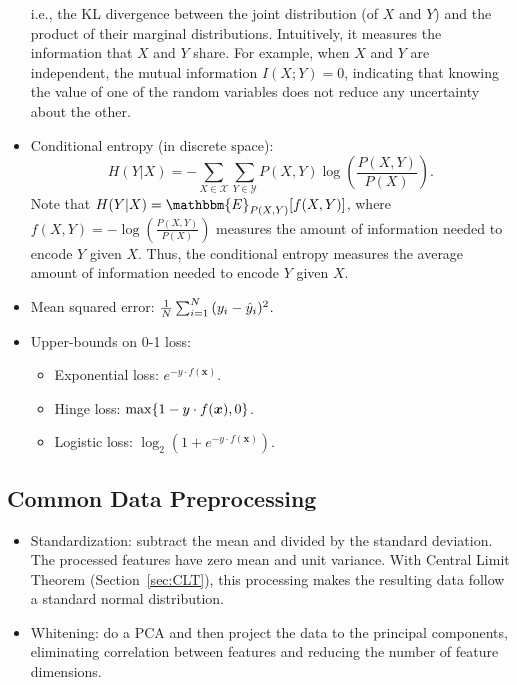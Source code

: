 \begin{itemize}
\begin{equation*}
            \end{equation*}
        i.e., the KL divergence between the joint distribution (of $X$ and $Y$) and the product of their marginal distributions.
        Intuitively, it measures the information that $X$ and $Y$ share. 
        For example, when $X$ and $Y$ are independent, the mutual information $I(X; Y)=0$, indicating that knowing the value of one of the random variables does not reduce any uncertainty about the other.
        \item Conditional entropy (in discrete space):
            \begin{equation*}
                H(Y|X) = - \sum_{X \in \mathcal{X}}^{}{
                    \sum_{Y \in \mathcal{Y}}^{}{
                        P(X, Y) \log\left(\frac{P(X, Y)}{P(X)}\right)
                    }
                }.
            \end{equation*}
        Note that $H(Y|X) = \mathbbm{E}_{P(X, Y)}[f(X, Y)]$, where $f(X, Y)=-\log\left(\frac{P(X, Y)}{P(X)}\right)$ measures the amount of information needed to encode $Y$ given $X$.
        Thus, the conditional entropy measures the average amount of information needed to encode $Y$ given $X$.
        \item Mean squared error: $\frac{1}{N}\sum_{i=1}^{N}{(y_i - \hat{y}_i)^2}$.
        \item Upper-bounds on 0-1 loss:
            \begin{itemize}
                \item Exponential loss: $e^{-y \cdot f(\bm{x})}$.
                \item Hinge loss: $\max\{ 1 - y \cdot f(\bm{x}), 0 \}$.
                \item Logistic loss: $\log_2\left( 1 + e^{-y \cdot f(\bm{x})}\right)$. 
            \end{itemize}
    \end{itemize}
    

\subsection{Common Data Preprocessing}
    \begin{itemize}
        \item Standardization: subtract the mean and divided by the standard deviation. The processed features have zero mean and unit variance. With Central Limit Theorem (Section~\ref{sec:CLT}), this processing makes the resulting data follow a standard normal distribution.
        \item Whitening: do a PCA and then project the data to the principal components, eliminating correlation between features and reducing the number of feature dimensions. 
    \end{itemize}
    


